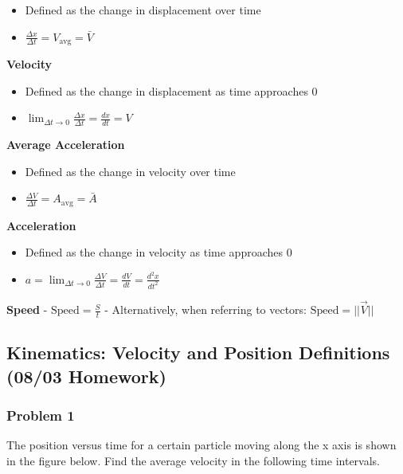 \documentclass[
  letterpaper,
  DIV=11,
  numbers=noendperiod]{scrartcl}
\providecommand{\tightlist}{%
  \setlength{\itemsep}{0pt}\setlength{\parskip}{0pt}}\usepackage{longtable,booktabs,array}
\begin{document}
\begin{itemize}
\tightlist
\item
  Defined as the change in displacement over time
\item
  \(\frac{\Delta x}{\Delta t} = V_\text{avg} = \bar{V}\)
\end{itemize}

\textbf{Velocity}

\begin{itemize}
\tightlist
\item
  Defined as the change in displacement as time approaches 0
\item
  \(\lim_{\Delta t \to 0} \frac{\Delta x}{\Delta t} = \frac{dx}{dt} = V\)
\end{itemize}

\textbf{Average Acceleration}

\begin{itemize}
\tightlist
\item
  Defined as the change in velocity over time
\item
  \(\frac{\Delta V}{\Delta t} = A_\text{avg} = \bar{A}\)
\end{itemize}

\textbf{Acceleration}

\begin{itemize}
\tightlist
\item
  Defined as the change in velocity as time approaches 0
\item
  \(a = \lim_{\Delta t \to 0} \frac{\Delta V}{\Delta t} = \frac{dV}{dt} = \frac{d^2x}{dt^2}\)
\end{itemize}

\textbf{Speed} - \(\text{Speed} = \frac{S}{t}\) - Alternatively, when
referring to vectors: \(\text{Speed} = ||\vec{V}||\)

\hypertarget{kinematics-velocity-and-position-definitions-0803-homework}{%
\subsection{Kinematics: Velocity and Position Definitions (08/03
Homework)}\label{kinematics-velocity-and-position-definitions-0803-homework}}

\hypertarget{problem-1}{%
\subsubsection{Problem 1}\label{problem-1}}

The position versus time for a certain particle moving along the x axis
is shown in the figure below. Find the average velocity in the following
time intervals.
\end{document}
